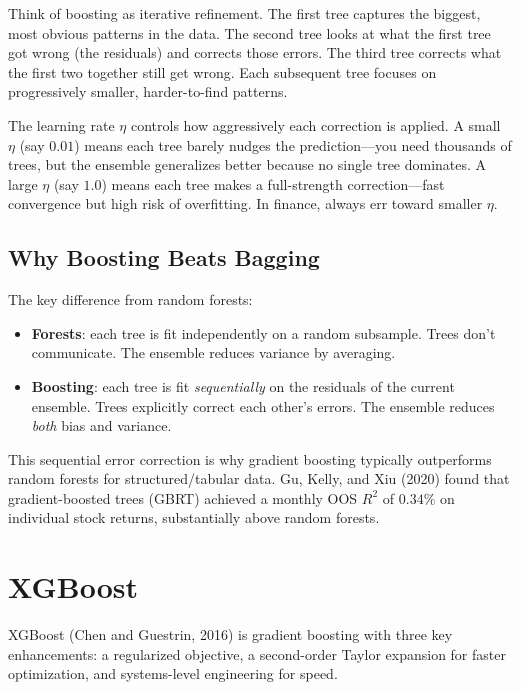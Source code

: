 \begin{intuition}
Think of boosting as iterative refinement.
The first tree captures the biggest, most obvious patterns in the data.
The second tree looks at what the first tree got wrong (the residuals) and corrects those errors.
The third tree corrects what the first two together still get wrong.
Each subsequent tree focuses on progressively smaller, harder-to-find patterns.

The learning rate $\eta$ controls how aggressively each correction is applied.
A small $\eta$ (say $0.01$) means each tree barely nudges the prediction---you need thousands of trees, but the ensemble generalizes better because no single tree dominates.
A large $\eta$ (say $1.0$) means each tree makes a full-strength correction---fast convergence but high risk of overfitting.
In finance, always err toward smaller $\eta$.
\end{intuition}

\subsection{Why Boosting Beats Bagging}

The key difference from random forests:
\begin{itemize}[nosep]
  \item \textbf{Forests}: each tree is fit independently on a random subsample. Trees don't communicate. The ensemble reduces variance by averaging.
  \item \textbf{Boosting}: each tree is fit \emph{sequentially} on the residuals of the current ensemble. Trees explicitly correct each other's errors. The ensemble reduces \emph{both} bias and variance.
\end{itemize}

This sequential error correction is why gradient boosting typically outperforms random forests for structured/tabular data.
Gu, Kelly, and Xiu (2020) found that gradient-boosted trees (GBRT) achieved a monthly OOS $R^2$ of $0.34\%$ on individual stock returns, substantially above random forests.

\section{XGBoost}
\label{sec:xgboost}

XGBoost (Chen and Guestrin, 2016) is gradient boosting with three key enhancements: a regularized objective, a second-order Taylor expansion for faster optimization, and systems-level engineering for speed.


